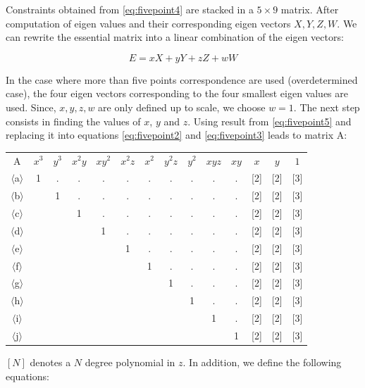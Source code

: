 \documentclass[12pt]{article}
\begin{document}
Constraints obtained from \ref{eq:fivepoint4} are stacked in a $5\times 9$ matrix. After computation of eigen values and their corresponding eigen vectors $X, Y, Z, W$. We can rewrite the essential matrix into a linear combination of the eigen vectors:

\begin{equation}
  \label{eq:fivepoint5}
  E = xX + yY + zZ + wW  
\end{equation}

In the case where more than five points correspondence are used (overdetermined case), the four eigen vectors corresponding to the four smallest eigen values are used. Since, $x, y, z, w$ are only defined up to scale, we choose $w=1$. The next step consists in finding the values of $x$, $y$ and $z$. Using result from \ref{eq:fivepoint5} and replacing it into equations \ref{eq:fivepoint2} and \ref{eq:fivepoint3} leads to matrix A:

\begin{center}
\begin{tabular}{|c| c c c c c c c c c c c c c|}
  \hline
  A & $x^3$ & $y^3$ & $x^2y$ & $xy^2$ & $x^2z$ & $x^2$ & $y^2z$ & $y^2$ & $xyz$ & $xy$ & $x$ & $y$ & $1$ \\
  $\langle$a$\rangle$ & 1 & . & . & . & . & . & . & . & . & . & [2] & [2] & [3] \\
  $\langle$b$\rangle$ & & 1 & . & . & . & . & . & . & . & . & [2] & [2] & [3] \\
  $\langle$c$\rangle$ & & & 1 & . & . & . & . & . & . & . & [2] & [2] & [3] \\
  $\langle$d$\rangle$ & & & & 1 & . & . & . & . & . & . & [2] & [2] & [3] \\
  $\langle$e$\rangle$ & & & & & 1 & . & . & . & . & . & [2] & [2] & [3] \\
  $\langle$f$\rangle$ & & & & & & 1 & . & . & . & . & [2] & [2] & [3] \\
  $\langle$g$\rangle$ & & & & & & & 1 & . & . & . & [2] & [2] & [3] \\
  $\langle$h$\rangle$ & & & & & & & & 1 & . & . & [2] & [2] & [3] \\
  $\langle$i$\rangle$ & & & & & & & & & 1 & . & [2] & [2] & [3] \\
  $\langle$j$\rangle$ & & & & & & & & & & 1 & [2] & [2] & [3] \\
  \hline
\end{tabular}
\end{center}
$[N]$ denotes a $N$ degree polynomial in $z$. In addition, we define the following equations: 
\end{document}
